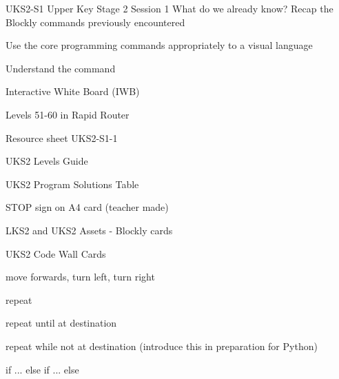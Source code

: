 \documentclass{../../../lessonplan}
\begin{document}
\lessonplantitle
    {UKS2-S1}
    {Upper Key Stage 2 Session 1}
    {What do we already know? Recap the Blockly commands previously encountered}

\preamble
    {
    \item Use the core programming commands appropriately to a visual language
    \item Understand the  command
    }
    {
    \item Interactive White Board (IWB)
    \item Levels 51-60 in Rapid Router
    \item Resource sheet UKS2-S1-1
    \item UKS2 Levels Guide
    \item UKS2 Program Solutions Table
    \item STOP sign on A4 card (teacher made)
    \item LKS2 and UKS2 Assets - Blockly cards
    \item UKS2 Code Wall Cards
    }
    {
    \item move forwards, turn left, turn right
    \item repeat
    \item repeat until at destination
    \item repeat while not at destination (introduce this in preparation for Python)
    \item if ... else if ... else
    }
\end{document}
